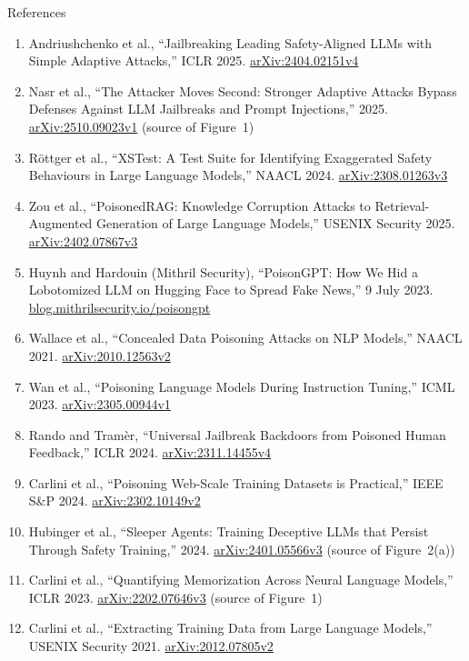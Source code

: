 \begin{frame}[allowframebreaks]{References}
\begin{enumerate}
    \item Andriushchenko et al., ``Jailbreaking Leading Safety-Aligned LLMs with Simple Adaptive Attacks,'' ICLR 2025. \href{https://arxiv.org/abs/2404.02151v4}{arXiv:2404.02151v4}
    \item Nasr et al., ``The Attacker Moves Second: Stronger Adaptive Attacks Bypass Defenses Against LLM Jailbreaks and Prompt Injections,'' 2025. \href{https://arxiv.org/abs/2510.09023v1}{arXiv:2510.09023v1} (source of Figure~1)
    \item R\"ottger et al., ``XSTest: A Test Suite for Identifying Exaggerated Safety Behaviours in Large Language Models,'' NAACL 2024. \href{https://arxiv.org/abs/2308.01263v3}{arXiv:2308.01263v3}
    \item Zou et al., ``PoisonedRAG: Knowledge Corruption Attacks to Retrieval-Augmented Generation of Large Language Models,'' USENIX Security 2025. \href{https://arxiv.org/abs/2402.07867v3}{arXiv:2402.07867v3}
    \item Huynh and Hardouin (Mithril Security), ``PoisonGPT: How We Hid a Lobotomized LLM on Hugging Face to Spread Fake News,'' 9 July 2023. \href{https://blog.mithrilsecurity.io/poisongpt-how-we-hid-a-lobotomized-llm-on-hugging-face-to-spread-fake-news/}{blog.mithrilsecurity.io/poisongpt}
    \item Wallace et al., ``Concealed Data Poisoning Attacks on NLP Models,'' NAACL 2021. \href{https://arxiv.org/abs/2010.12563v2}{arXiv:2010.12563v2}
    \item Wan et al., ``Poisoning Language Models During Instruction Tuning,'' ICML 2023. \href{https://arxiv.org/abs/2305.00944v1}{arXiv:2305.00944v1}
    \item Rando and Tram\`er, ``Universal Jailbreak Backdoors from Poisoned Human Feedback,'' ICLR 2024. \href{https://arxiv.org/abs/2311.14455v4}{arXiv:2311.14455v4}
    \item Carlini et al., ``Poisoning Web-Scale Training Datasets is Practical,'' IEEE S\&P 2024. \href{https://arxiv.org/abs/2302.10149v2}{arXiv:2302.10149v2}
    \item Hubinger et al., ``Sleeper Agents: Training Deceptive LLMs that Persist Through Safety Training,'' 2024. \href{https://arxiv.org/abs/2401.05566v3}{arXiv:2401.05566v3} (source of Figure~2(a))
    \item Carlini et al., ``Quantifying Memorization Across Neural Language Models,'' ICLR 2023. \href{https://arxiv.org/abs/2202.07646v3}{arXiv:2202.07646v3} (source of Figure~1)
    \item Carlini et al., ``Extracting Training Data from Large Language Models,'' USENIX Security 2021. \href{https://arxiv.org/abs/2012.07805v2}{arXiv:2012.07805v2}

\end{enumerate}
\end{frame}
